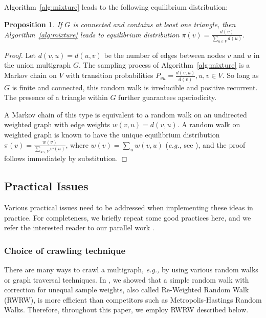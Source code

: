 \documentclass[10pt, conference]{./IEEEtran}
\newcommand{\eg}{{\em e.g., }}
\newtheorem{proposition}[theorem]{Proposition}
\begin{document}
Algorithm~\ref{alg:mixture}
%
leads to the following equilibrium distribution:

\smallskip

%
%
%
\begin{proposition}
If $G$ is connected and contains at least one triangle, then Algorithm~\ref{alg:mixture} leads to equilibrium distribution $\pi(v)=\frac{d(v)}{\sum_{u\in V} d(u)}$.
\label{lemma:equilibrium}
\end{proposition}
\begin{proof}
Let $d(v,u)=d(u,v)$ be the number of edges between nodes $v$ and $u$ in the union multigraph $G$.
The sampling process of Algorithm~\ref{alg:mixture} is a Markov chain on $V$ with transition probabilities $P_{vu}=\frac{d(v,u)}{d(v)}, u,v \in V$.  So long as $G$ is finite and connected,
this random walk is irreducible and positive recurrent. The presence of a triangle within $G$ further guarantees aperiodicity.
%
%
%
%
%
%
%

A Markov chain of this type is equivalent to a random walk on an undirected weighted graph with edge weights $w(v,u)=d(v,u)$.
A random walk on weighted graph is known to have the unique equilibrium distribution
$\pi(v)=\frac{w(v)}{\sum_{u\in V} w(u)}$, where  $w(v)=\sum_{u} w(v,u)$
(\eg see \cite[Example 4.32]{RossBook}), and the proof follows immediately by substitution.
\end{proof}



\subsection{Practical Issues}

Various practical issues need to be addressed when implementing these ideas in practice. For completeness, we briefly repeat some good practices here, and we refer the interested reader
to our parallel work \cite{Gjoka2010, Gjoka2011_Facebook_JSAC}.

\subsubsection{Choice of crawling technique}

There are many ways to crawl a multigraph, \eg by using various random walks or graph traversal techniques. In \cite{Gjoka2011_Facebook_JSAC}, we showed that a simple random walk with correction for unequal sample weights, also called Re-Weighted Random Walk (RWRW),
%
is more efficient than competitors such as Metropolis-Hastings Random Walks. %
Therefore, throughout this paper, we employ RWRW described below.
\end{document}
